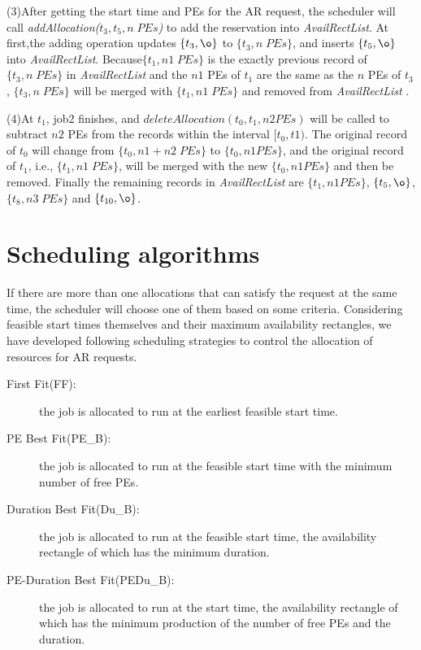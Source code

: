 \documentclass[preprint,12pt]{elsarticle}
\begin{document}
(3)After getting the start time and PEs for the AR request, the scheduler will call \emph{addAllocation($t_3,t_5,n \;PEs$)} to add the reservation into \emph{AvailRectList}. At first,the adding operation updates $\{t_3,\o\}$ to $\{t_3,n \;PEs\}$, and inserts $\{t_5,\o\}$ into \emph{AvailRectList}. Because$\{t_1,n1\;PEs \}$ is the exactly previous record of $\{t_3, n \;PEs\}$ in \emph{AvailRectList} and the $n1$ PEs of $t_1$ are the same as the $n$ PEs of $t_3$, $\{t_3, n \;PEs\}$ will be merged with $\{t_1, n1 \;PEs \}$ and removed from \emph{AvailRectList} .

(4)At $t_1$, job2 finishes, and ${deleteAllocation(t_0,t_1, n2 PEs)}$ will be called to subtract $n2$ PEs from the records within the interval $[t_0,t1)$. The original record of $t_0$ will change from $\{t_0,n1+n2\; PEs\}$ to $\{t_0,n1 PEs\}$, and the original record of $t_1$, i.e., $\{t_1,n1\;PEs \}$, will be merged with the new $\{t_0,n1 PEs\}$ and then be removed. Finally the remaining records in \emph{AvailRectList} are $\{t_1,n1 PEs\}$, $\{t_5,\o\}$, $\{t_8,n3\;PEs\}$ and $\{t_{10},\o\}$.


\section{Scheduling algorithms}
\label{sect:strategies}
If there are more than one allocations that can satisfy the request at the same time, the scheduler will choose one of them based on some criteria. Considering feasible start times themselves and their maximum availability rectangles, we have developed following scheduling strategies to control the allocation of resources for AR requests.

\begin{description}
  \item[First Fit(FF):] the job is allocated to run at the earliest feasible start time.
  \item[PE Best Fit(PE\_B):] the job is allocated to run at the feasible start time with the minimum number of free PEs.

  \item[Duration Best Fit(Du\_B):] the job is allocated to run at the feasible start time, the availability rectangle of which has the minimum duration.

  \item[PE-Duration Best Fit(PEDu\_B):] the job is allocated to run at the start time, the availability rectangle of which has the minimum production of the number of free PEs and the duration.
\end{description}
\end{document}
